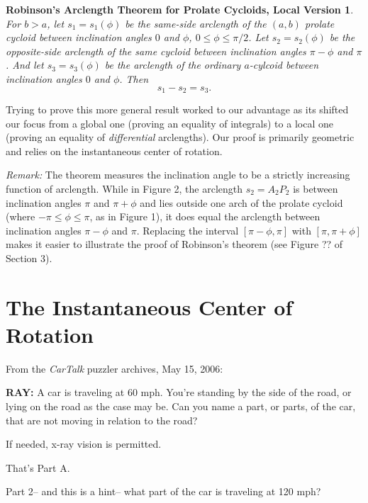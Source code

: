 \documentclass{ximera}
\newtheorem{theorem19}{Robinson's Arclength Theorem for Prolate Cycloids, Local Version}
\begin{document}
\begin{theorem19}

For $b>a$, let $s_1 = s_1(\phi)$ be the same-side arclength of the $(a,b)$ prolate cycloid between inclination angles $0$ and $\phi$, $0\leq \phi \leq \pi/2$. Let $s_2 = s_2(\phi)$ be the opposite-side arclength of the same cycloid between inclination angles $\pi - \phi$ and $\pi$ . And let $s_3 = s_3(\phi)$ be the arclength of the ordinary $a$-cylcoid between inclination angles $0$ and $\phi$. Then
\[
s_1 - s_2 = s_3.
\]
\end{theorem19}

Trying to prove this more general result worked to our advantage as its shifted our focus from a global one (proving an equality of integrals) to  a local one (proving an equality of \emph{differential} arclengths). Our proof is primarily geometric and relies on the instantaneous center of rotation.

\emph{Remark:} The theorem measures the inclination angle to be a strictly increasing function of arclength. While in Figure 2, the arclength $s_2=A_2P_2$ is between inclination angles $\pi$ and $\pi +\phi$ and lies outside one arch of the prolate cycloid (where $-\pi \leq \phi \leq \pi$, as in Figure 1), it does equal the arclength between inclination angles $\pi-\phi$ and $\pi$. Replacing the interval $[\pi-\phi, \pi]$ with $[\pi, \pi +\phi]$ makes it easier to illustrate the proof of Robinson's theorem (see Figure ?? of Section 3).





\section{The Instantaneous Center of Rotation}
From the \emph{CarTalk} puzzler archives, May 15, 2006:

\small{{\bf RAY:} A car is traveling at 60 mph. You're standing by the side of the road, or lying on the road as the case may be. Can you name a part, or parts, of the car, that are not moving in relation to the road?

If needed, x-ray vision is permitted.

That's Part A.

Part 2-- and this is a hint-- what part of the car is traveling at 120 mph?}
\end{document}
